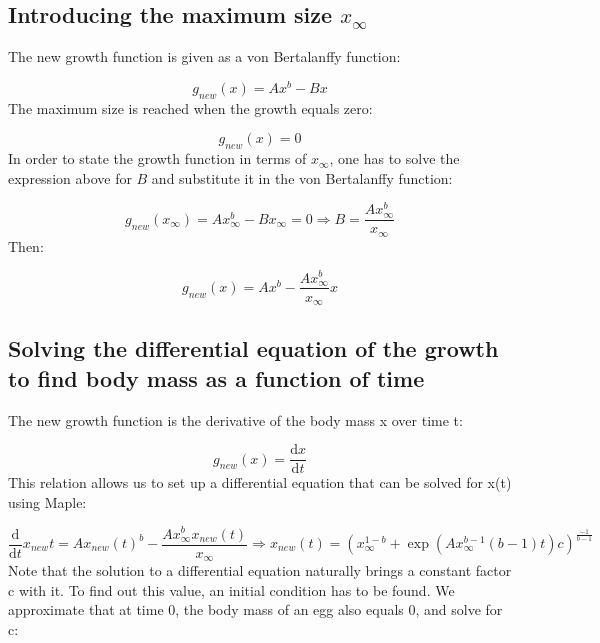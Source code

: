 \documentclass{article}
\numberwithin{equation}{section} %
\newcommand{\md}{\mathrm{d}}
\begin{document}
\subsection{Introducing the maximum size $x_\infty$}\label{sec:Ex6A}
The new growth function is given as a von Bertalanffy function:

\begin{equation}
    g_{new}(x)=Ax^b-Bx
\end{equation}
The maximum size is reached when the growth equals zero:

\begin{equation}
    g_{new}(x)=0
\end{equation}
In order to state the growth function in terms of $x_\infty$, one has to solve the expression above for $B$ and substitute it in the von Bertalanffy function:

\begin{equation}
    g_{new}(x_\infty)=Ax_\infty^b-Bx_\infty = 0   \Rightarrow B=\dfrac{Ax_\infty^b}{x_\infty}
\end{equation}
Then:

\begin{equation}
    g_{new}(x)=Ax^b-\dfrac{Ax_\infty^b}{x_\infty}x
\end{equation}

\subsection{Solving the differential equation of the growth to find body mass as a function of time}\label{sec:Ex6B}
The new growth function is the derivative of the body mass x over time t:

\begin{equation}
    g_{new}(x)=\dfrac{\md x}{\md t}
\end{equation}
This relation allows us to set up a differential equation that can be solved for x(t) using Maple:

\begin{equation}
    \dfrac{\md}{\md t}x_{new}t=Ax_{new}(t)^b-\dfrac{Ax_\infty^bx_{new}(t)}{x_\infty} \Rightarrow x_{new}(t)=\left( x_\infty^{1-b}+\exp(Ax_\infty^{b-1}(b-1)t)c \right)^{\tfrac{-1}{b-1}}
\end{equation}
Note that the solution to a differential equation naturally brings a constant factor c with it. To find out this value, an initial condition has to be found.
We approximate that at time 0, the body mass of an egg also equals 0, and solve for c:
\end{document}
